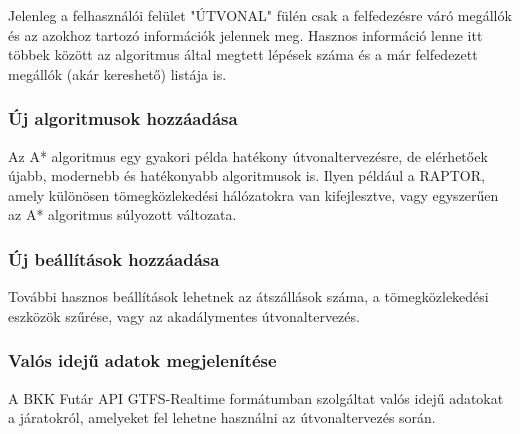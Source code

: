 Jelenleg a felhasználói felület "ÚTVONAL" fülén csak a felfedezésre váró megállók és az azokhoz tartozó információk jelennek meg. Hasznos információ lenne itt többek között az algoritmus által megtett lépések száma és a már felfedezett megállók (akár kereshető) listája is.

\subsubsection{Új algoritmusok hozzáadása}

Az A* algoritmus egy gyakori példa hatékony útvonaltervezésre, de elérhetőek újabb, modernebb és hatékonyabb algoritmusok is. Ilyen például a RAPTOR\cite{raptor}, amely különösen tömegközlekedési hálózatokra van kifejlesztve, vagy egyszerűen az A* algoritmus súlyozott változata.

\subsubsection{Új beállítások hozzáadása}

További hasznos beállítások lehetnek az átszállások száma, a tömegközlekedési eszközök szűrése, vagy az akadálymentes útvonaltervezés.

\subsubsection{Valós idejű adatok megjelenítése}

A BKK Futár API GTFS-Realtime formátumban szolgáltat valós idejű adatokat a járatokról\cite{bkkopendata}, amelyeket fel lehetne használni az útvonaltervezés során.
